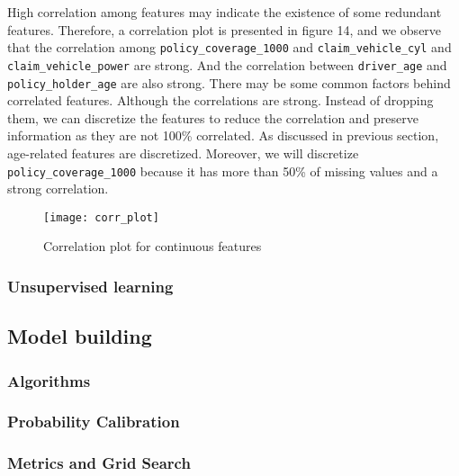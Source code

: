 \documentclass[12pt]{article}
\begin{document}
High correlation among features may indicate the existence of some redundant features. Therefore, a correlation plot is presented in figure 14, and we observe that the correlation among \texttt{policy\_coverage\_1000} and \texttt{claim\_vehicle\_cyl} and \texttt{claim\_vehicle\_power} are strong. And the correlation between \texttt{driver\_age} and \texttt{policy\_holder\_age} are also strong. There may be some common factors behind correlated features. Although the correlations are strong. Instead of dropping them, we can discretize the features to reduce the correlation and preserve information as they are not 100\% correlated. As discussed in previous section, age-related features are discretized. Moreover, we will discretize \texttt{policy\_coverage\_1000} because it has more than 50\% of missing values and a strong correlation.

\begin{figure}[h]
\centering
\texttt{[image: corr\_plot]}
\caption{Correlation plot for continuous features}
\end{figure}



\subsubsection*{Unsupervised learning}

\subsection*{Model building}

\subsubsection*{Algorithms}

\subsubsection*{Probability Calibration}

\subsubsection*{Metrics and Grid Search}
\end{document}
